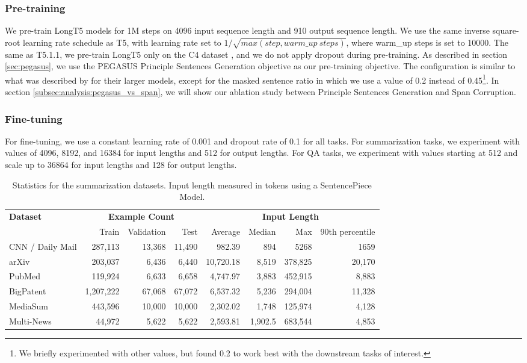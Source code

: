 \documentclass[11pt]{article}
\begin{document}
\subsubsection{Pre-training}
We pre-train LongT5 models for 1M steps on 4096 input sequence length and 910 output sequence length. We use the same inverse square-root learning rate schedule as T5, with learning rate set to $1/\sqrt{max(step, warm\_up\ steps)}$, where warm\_up steps is set to 10000. The same as T5.1.1, we pre-train LongT5 only on the C4 dataset \cite{c4}, and we do not apply dropout during pre-training. As described in section \ref{sec:pegasus}, we use the PEGASUS Principle Sentences Generation objective as our pre-training objective. The configuration is similar to what was described by  for their larger models, except for the masked sentence ratio in which we use a value of 0.2 instead of 0.45\footnote{We briefly experimented with other values, but found 0.2 to work best with the downstream tasks of interest.}. In section \ref{subsec:analysis:pegasus_vs_span}, we will show our ablation study between Principle Sentences Generation and Span Corruption.

\subsubsection{Fine-tuning}
For fine-tuning, we use a constant learning rate of 0.001 and dropout rate of 0.1 for all tasks. 
For summarization tasks, we experiment with values of 4096, 8192, and 16384 for input lengths and 512 for output lengths.
For QA tasks, we experiment with values starting at 512 and scale up to 36864 for input lengths and 128 for output lengths.



\begin{table*}\small
    \centering
    \begin{tabular}{ p{2.45cm} | r r r | r r r r } \toprule
    \multirow{2}{*}{\textbf{Dataset}} & \multicolumn{3}{c}{\textbf{Example Count}} & \multicolumn{4}{c}{\textbf{Input Length}}  \\ 
    & Train & Validation & Test & Average & Median & Max & 90th percentile \\ \midrule
    CNN / Daily Mail      & 287,113 & 13,368 & 11,490  & 982.39 & 894 & 5268 & 1659 \\
    arXiv      & 203,037 & 6,436 & 6,440 & 10,720.18 & 8,519 & 378,825 & 20,170 \\
    PubMed  & 119,924 & 6,633 & 6,658 & 4,747.97 & 3,883 & 452,915 & 8,883 \\
    BigPatent   & 1,207,222 & 67,068 & 67,072 & 6,537.32 & 5,236 & 294,004 & 11,328\\
    MediaSum    & 443,596  & 10,000 & 10,000 & 2,302.02 & 1,748 & 125,974 & 4,128 \\
    Multi-News   & 44,972 & 5,622 & 5,622 & 2,593.81 & 1,902.5 & 683,544 & 4,853\\
    \bottomrule
    \end{tabular}
    \caption{Statistics for the summarization datasets. Input length measured in tokens using a SentencePiece Model.}
    \label{tab:summarization_stats}
\end{table*}
\end{document}
